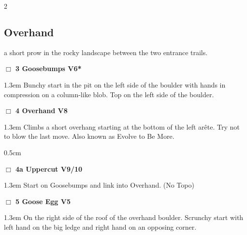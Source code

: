 \begin{multicols}{2}
\subsection*{Overhand}\label{bf:Overhand}
a short prow in the rocky landscape between the two entrance trails.\\
\needspace{2em}
\label{rt:Goosebumps}
\colorbox{RoyalBlue!20}{
\parbox{0.95\linewidth}{
\hspace{-1ex}\textbf{$\Box$
3 Goosebumps V6*  
}}}
\begin{adjustwidth}{1.3em}{}			
Bunchy start in the pit on the left side of the boulder with hands in compression on a column-like blob. Top on the left side of the boulder.
\end{adjustwidth}
\needspace{2em}
\label{rt:Overhand}
\colorbox{Goldenrod!20}{
\parbox{0.95\linewidth}{
\hspace{-1ex}\textbf{$\Box$
4 Overhand V8  \warn
}}}
\begin{adjustwidth}{1.3em}{}			
Climbs a short overhang starting at the bottom of the left arête. Try not to blow the last move. Also known as Evolve to Be More.
\end{adjustwidth}
\begin{adjustwidth}{0.5cm}{}				
\needspace{4em}
\needspace{2em}
\label{vr:Uppercut}
\colorbox{red!20}{
\parbox{0.95\linewidth}{
\hspace{-1ex}\textbf{$\Box$
4a Uppercut V9/10  
}}}
\begin{adjustwidth}{1.3em}{}			
Start on Goosebumps and link into Overhand.
  (No Topo)
\end{adjustwidth}
\end{adjustwidth}
\needspace{2em}
\label{rt:Goose Egg}
\colorbox{RoyalBlue!20}{
\parbox{0.95\linewidth}{
\hspace{-1ex}\textbf{$\Box$
5 Goose Egg V5  
}}}
\begin{adjustwidth}{1.3em}{}			
On the right side of the roof of the overhand boulder. Scrunchy start with left hand on the big ledge and right hand on an opposing corner.
\end{adjustwidth}
	\end{multicols}
\label{tp:Boys in the Woods}
	
